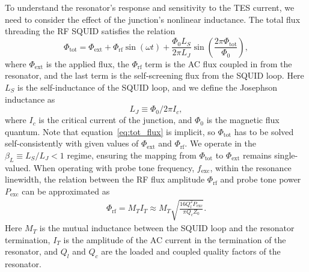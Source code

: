 \documentclass[10pt]{iopart}
\begin{document}
To understand the resonator's response and sensitivity to the TES current, we need to consider the effect of the junction's nonlinear inductance. The total flux threading the RF SQUID satisfies the relation~\cite{wegner_analytical_2022}
\begin{equation} \label{eq:tot_flux}
\Phi_{\mathrm{tot}} = \Phi_{\mathrm{ext}} + \Phi_{\mathrm{rf}} \sin(\omega t) + \frac{\Phi_0 L_S}{2\pi L_J} \sin\left( \frac{2\pi \Phi_{\mathrm{tot}}}{\Phi_0} \right),
\end{equation}
where $\Phi_{\mathrm{ext}}$ is the applied flux, the $\Phi_{\mathrm{rf}}$ term is the AC flux coupled in from the resonator, and the last term is the self-screening flux from the SQUID loop. Here $L_S$ is the self-inductance of the SQUID loop, and we define the Josephson inductance as
\begin{equation} \label{eq:L_J_def}
    L_J\equiv\Phi_0/2\pi I_c,
\end{equation}
where $I_c$ is the critical current of the junction, and $\Phi_0$ is the magnetic flux quantum. Note that equation~\eqref{eq:tot_flux} is implicit, so $\Phi_{\text{tot}}$ has to be solved self-consistently with given values of $\Phi_{\text{ext}}$ and $\Phi_{\text{rf}}$. We operate in the $\beta_L\equiv L_S/L_J<1$ regime, ensuring the mapping from $\Phi_{\text{tot}}$ to $\Phi_{\text{ext}}$ remains single-valued. When operating with probe tone frequency, $f_{\text{exc}}$, within the resonance linewidth, the relation between the RF flux amplitude $\Phi_{\text{rf}}$ and probe tone power $P_{\text{exc}}$ can be approximated as~\cite{wegner_analytical_2022}
\begin{gather} \label{eq:Phi_rf}
    \Phi_{\text{rf}} = M_T I_T \approx M_T \sqrt{\frac{16 Q_l^2 P_{\text{exc}}}{\pi Q_c Z_0}}.
\end{gather}
Here $M_T$ is the mutual inductance between the SQUID loop and the resonator termination, $I_T$ is the amplitude of the AC current in the termination of the resonator, and $Q_l$ and $Q_c$ are the loaded and coupled quality factors of the resonator.
\end{document}
